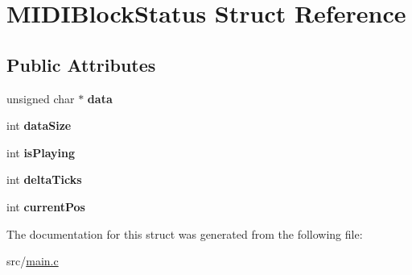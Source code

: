 \hypertarget{structMIDIBlockStatus}{\section{M\-I\-D\-I\-Block\-Status Struct Reference}
\label{structMIDIBlockStatus}
}
\subsection*{Public Attributes}
\begin{DoxyCompactItemize}
\item 
\hypertarget{structMIDIBlockStatus_a4ff218757771301c23514d2ab31af146}{unsigned char $\ast$ {\bfseries data}}\label{structMIDIBlockStatus_a4ff218757771301c23514d2ab31af146}

\item 
\hypertarget{structMIDIBlockStatus_af35dc6eeaa93f01c73e308a6d34316d3}{int {\bfseries data\-Size}}\label{structMIDIBlockStatus_af35dc6eeaa93f01c73e308a6d34316d3}

\item 
\hypertarget{structMIDIBlockStatus_a1db881c91aaf122add746eacb30acebf}{int {\bfseries is\-Playing}}\label{structMIDIBlockStatus_a1db881c91aaf122add746eacb30acebf}

\item 
\hypertarget{structMIDIBlockStatus_a671d56d5ecea2ed5e94b871e5995c6f1}{int {\bfseries delta\-Ticks}}\label{structMIDIBlockStatus_a671d56d5ecea2ed5e94b871e5995c6f1}

\item 
\hypertarget{structMIDIBlockStatus_a27dae156bd6248d095ad04d41ef6d4f8}{int {\bfseries current\-Pos}}\label{structMIDIBlockStatus_a27dae156bd6248d095ad04d41ef6d4f8}

\end{DoxyCompactItemize}


The documentation for this struct was generated from the following file\-:\begin{DoxyCompactItemize}
\item 
src/\hyperlink{main_8c}{main.\-c}\end{DoxyCompactItemize}
